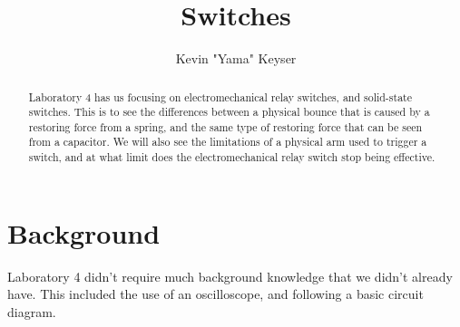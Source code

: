 \documentclass[%
 aip,
 jmp,
 amsmath,
 amssymb,
 reprint,%
 numerical,
 longbibliography,
]{revtex4-1}
\begin{document}

\title[Laboratory 4]{Switches} %

\author{Kevin "Yama" Keyser}
%


\begin{abstract}

Laboratory 4 has us focusing on electromechanical relay switches, and solid-state
switches. This is to see the differences between a physical bounce that is caused
by a restoring force from a spring, and the same type of restoring force that can
be seen from a capacitor. We will also see the limitations of a physical arm used
to trigger a switch, and at what limit does the electromechanical relay switch 
stop being effective.

\end{abstract}

\maketitle

%

\section{Background}

Laboratory 4 didn't require much background knowledge that we didn't already have. This included
the use of an oscilloscope, and following a basic circuit diagram.
\end{document}
